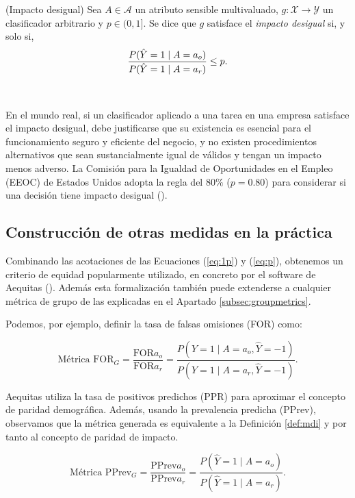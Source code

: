 \documentclass[oneside,openright,titlepage,numbers=noenddot,openany,headinclude,footinclude=true,
cleardoublepage=empty,abstractoff,BCOR=5mm,paper=a4,fontsize=12pt,main=spanish]{scrreprt}
\begin{document}
\begin{definition}(Impacto desigual) \label{def:mdi}
Sea $A \in \mathcal{A}$ un atributo sensible multivaluado, $g\colon \mathcal{X} \to \mathcal{Y}$ un clasificador arbitrario y $p\in (0,1]$. Se dice que $g$ satisface el \textit{impacto desigual} si, y solo si,
\begin{equation} \label{eq:1p}
    \frac{\displaystyle P(\hat{Y}=1 \mid A=a_o)}{\displaystyle P(\hat{Y}=1 \mid A=a_r)}\leq p.
\end{equation}
\end{definition}\

En el mundo real, si un clasificador aplicado a una tarea en una empresa satisface el impacto desigual, debe justificarse que su existencia es esencial para el funcionamiento seguro y eficiente del negocio, y no existen procedimientos alternativos que sean sustancialmente igual de válidos y tengan un impacto menos adverso. La Comisión para la Igualdad de Oportunidades en el Empleo (EEOC) de Estados Unidos adopta la regla del $80\%$ ($p = 0.80$) para considerar si una decisión tiene impacto desigual (\cite{adverse2009}).

\subsection*{Construcción de otras medidas en la práctica}

Combinando las acotaciones de las Ecuaciones (\ref{eq:1p}) y (\ref{eq:p}), obtenemos un criterio de equidad popularmente utilizado, en concreto por el software de Aequitas (\cite{aequitas2019}). Además esta formalización también puede extenderse a cualquier métrica de grupo de las explicadas en el Apartado \ref{subsec:groupmetrics}.

Podemos, por ejemplo, definir la tasa de falsas omisiones (FOR) como:

\begin{equation*} 
\text{Métrica FOR}_G =\frac{\text{FOR}{a_o}}{\text{FOR}{a_r}}=\frac{P(Y=1 \mid A=a_o, \hat{Y}=-1)}{P(Y=1 \mid A=a_r, \hat{Y}=-1)}.
\end{equation*}

Aequitas utiliza la tasa de positivos predichos (PPR) para aproximar el concepto de paridad demográfica. Además, usando la prevalencia predicha (PPrev), observamos que la métrica generada es equivalente a la Definición \ref{def:mdi} y por tanto al concepto de paridad de impacto.

\begin{equation*} 
\text{Métrica PPrev}_G=\frac{\text{PPrev}{a_o}}{\text{PPrev}{a_r}}=\frac{P(\hat{Y}=1 \mid A=a_o)}{P(\hat{Y}=1 \mid A=a_r)}.
\end{equation*}
\end{document}
